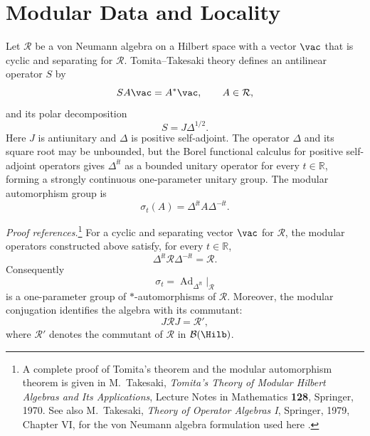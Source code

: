 \section{Modular Data and Locality}

Let \(\mathcal R\) be a von Neumann algebra on a Hilbert space with a vector
\(\vac\) that is cyclic and separating for \(\mathcal R\).  Tomita--Takesaki
theory defines an antilinear operator \(S\) by
\[
  S A\vac=A^*\vac,\qquad A\in\mathcal R,
\]
and its polar decomposition
\[
  S=J\Delta^{1/2}.
\]
Here \(J\) is antiunitary and \(\Delta\) is positive self-adjoint.  The
operator \(\Delta\) and its square root may be unbounded, but the Borel
functional calculus for positive self-adjoint operators gives
\(\Delta^{\ii t}\) as a bounded unitary operator for every \(t\in\mathbb R\),
forming a strongly continuous one-parameter unitary group.  The modular
automorphism group is
\[
  \sigma_t(A)=\Delta^{\ii t}A\Delta^{-\ii t}.
\]

\begin{quotedtheorem}
\emph{Proof references.}\footnote{A complete proof of Tomita's theorem and
the modular automorphism theorem is given in M.~Takesaki,
\emph{Tomita's Theory of Modular Hilbert Algebras and Its Applications},
Lecture Notes in Mathematics \textbf{128}, Springer, 1970.  See also
M.~Takesaki, \emph{Theory of Operator Algebras I}, Springer, 1979, Chapter
VI, for the von Neumann algebra formulation used here \cite{Takesaki1970}.}
For a cyclic and separating vector \(\vac\) for \(\mathcal R\), the modular
operators constructed above satisfy, for every \(t\in\mathbb R\),
\[
  \Delta^{\ii t}\mathcal R\Delta^{-\ii t}=\mathcal R .
\]
Consequently
\[
  \sigma_t=\operatorname{Ad}_{\Delta^{\ii t}}\big|_{\mathcal R}
\]
is a one-parameter group of \(*\)-automorphisms of \(\mathcal R\).  Moreover,
the modular conjugation identifies the algebra with its commutant:
\[
  J\mathcal R J=\mathcal R',
\]
where \(\mathcal R'\) denotes the commutant of \(\mathcal R\) in
\(\mathcal B(\Hilb)\).
\end{quotedtheorem}


